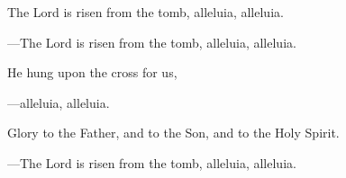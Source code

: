 \responsory
\begin{hangpar}

The Lord is risen from the tomb, alleluia, alleluia.

{\color{red}---\thinspace}The Lord is risen from the tomb, alleluia, alleluia.

\medskip He hung upon the cross for us,

{\color{red}---\thinspace}alleluia, alleluia.

\medskip Glory to the Father, and to the Son, and to the Holy Spirit.

{\color{red}---\thinspace}The Lord is risen from the tomb, alleluia, alleluia.
\end{hangpar}
